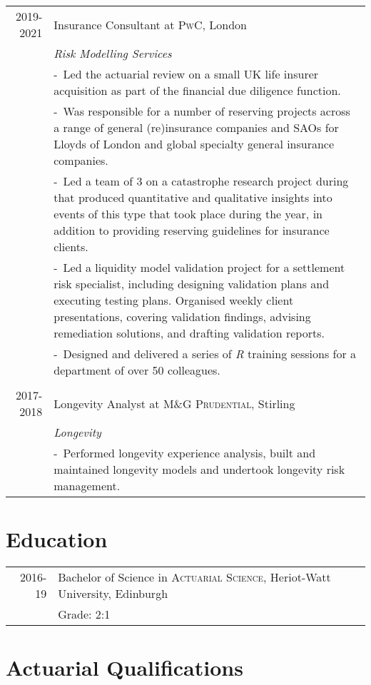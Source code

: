 \documentclass[a4paper,10pt]{article}
\newcommand{\blankline}{\multicolumn{1}{c}{}\\}
\newcommand{\projectitem}{\footnotesize-~\ignorespaces}
\begin{document}
\begin{tabularx}{\textwidth}{@{}r|>{\raggedright\arraybackslash}X@{}}
  \textsc{2019-2021} & Insurance Consultant at \textsc{PwC}, London \\
 & \emph{Risk Modelling Services}\\
 & \projectitem Led the actuarial review on a small UK life insurer acquisition as part of the financial due diligence function. \\
 & \projectitem Was responsible for a number of reserving projects across a range of general (re)insurance companies and SAOs for Lloyds of London and global specialty general insurance companies.\\
  & \projectitem Led a team of 3 on a catastrophe research project during that produced quantitative and qualitative insights into events of this type that took place during the year, in addition to providing reserving guidelines for insurance clients.\\
  & \projectitem Led a liquidity model validation project for a settlement risk specialist, including designing validation plans and executing testing plans. Organised weekly client presentations, covering validation findings, advising remediation solutions, and drafting validation reports.\\
  & \projectitem Designed and delivered a series of \emph{R} training sessions for a department of over 50 colleagues.\\
  \blankline

  \textsc{2017-2018} & Longevity Analyst at \textsc{M\&G Prudential}, Stirling \\
 & \emph{Longevity}\\
 & \projectitem Performed longevity experience analysis, built and maintained longevity models and undertook longevity risk management.\\
\end{tabularx}

\section{Education}

\begin{tabular}{rl}	
\textsc{2016-19}& Bachelor of Science in \textsc{Actuarial Science}, Heriot-Watt University, Edinburgh\\
&Grade: 2:1
\end{tabular}

\section{Actuarial Qualifications}
\end{document}

